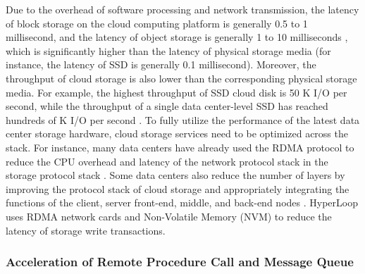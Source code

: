 Due to the overhead of software processing and network transmission, the latency of block storage on the cloud computing platform is generally 0.5 to 1 millisecond, and the latency of object storage is generally 1 to 10 milliseconds \cite{jonas2019cloud}, which is significantly higher than the latency of physical storage media (for instance, the latency of SSD is generally 0.1 millisecond). Moreover, the throughput of cloud storage is also lower than the corresponding physical storage media. For example, the highest throughput of SSD cloud disk is 50 K I/O per second, while the throughput of a single data center-level SSD has reached hundreds of K I/O per second \cite{jonas2019cloud}. To fully utilize the performance of the latest data center storage hardware, cloud storage services need to be optimized across the stack. For instance, many data centers have already used the RDMA protocol to reduce the CPU overhead and latency of the network protocol stack in the storage protocol stack \cite{guo2016rdma}. Some data centers also reduce the number of layers by improving the protocol stack of cloud storage and appropriately integrating the functions of the client, server front-end, middle, and back-end nodes \cite{nitro-blog}. HyperLoop \cite{kim2018hyperloop} uses RDMA network cards and Non-Volatile Memory (NVM) to reduce the latency of storage write transactions.

\subsubsection{Acceleration of Remote Procedure Call and Message Queue}
\label{future:rpc}

